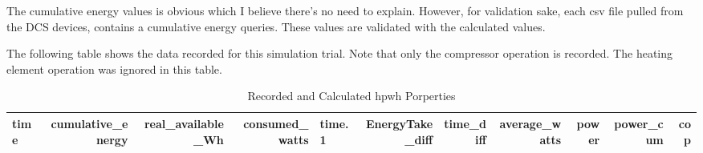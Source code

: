 The cumulative energy values is obvious which I believe there's no need to explain. However, for validation sake, each
csv file pulled from the DCS devices, contains a cumulative energy queries. These values are validated with the
calculated values.

The following table shows the data recorded for this simulation trial. Note that only the compressor operation is
recorded. The heating element operation was ignored in this table. 

\begin{table}[ht!]
\caption{Recorded and Calculated \gls{hpwh} Porperties}
\begin{adjustbox}{max width=\textwidth}
\begin{tabular}{|l|r|r|r|l|r|r|r|r|r|r|}
\hline
time &  cumulative\_energy &  real\_available\_Wh &  consumed\_watts &   time.1 &  EnergyTake\_diff &  time\_diff &  average\_watts &  power &  power\_cum &  cop \\ \hline


\end{tabular}
\end{adjustbox}
\end{table}
